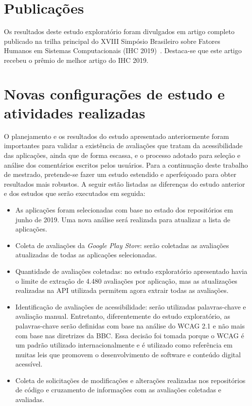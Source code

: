 \section{Publicações}
\label{sec:publicacoes}

Os resultados deste estudo exploratório foram divulgados em artigo completo publicado na trilha principal do XVIII Simpósio Brasileiro sobre Fatores Humanos em Sistemas Computacionais (IHC 2019)~\cite{ihc2019}. Destaca-se que este artigo recebeu o prêmio de melhor artigo do IHC 2019. 

\section{Novas configurações de estudo e atividades realizadas}
\label{sec:atividadesrealizadas}

O planejamento e os resultados do estudo apresentado anteriormente foram importantes para validar a existência de avaliações que tratam da acessibilidade das aplicações, ainda que de forma escassa, e o processo adotado para seleção e análise dos comentários escritos pelos usuários. 
Para a continuação deste trabalho de mestrado, pretende-se fazer um estudo estendido e aperfeiçoado para obter resultados mais robustos. A seguir estão listadas as diferenças do estudo anterior e dos estudos que serão executados em seguida:
\begin{itemize}
 \item As aplicações foram selecionadas com base no estado dos repositórios em junho de 2019. Uma nova análise será realizada para atualizar a lista de aplicações.
 \item Coleta de avaliações da \textit{Google Play Store}: serão coletadas as avaliações atualizadas de todas as aplicações selecionadas.
 \item Quantidade de avaliações coletadas: no estudo exploratório apresentado havia o limite de extração de 4.480 avaliações por aplicação, mas as atualizações realizadas na API utilizada permitem agora extrair todas as avaliações.
 \item Identificação de avaliações de acessibilidade: serão utilizadas palavras-chave e avaliação manual. Entretanto, diferentemente do estudo exploratório, as palavras-chave serão definidas com base na análise do WCAG 2.1 e não mais com base nas diretrizes da BBC. Essa decisão foi tomada porque o WCAG é um padrão utilizado internacionalmente e é utilizado como referência em muitas leis que promovem o desenvolvimento de software e conteúdo digital acessível. 
 \item Coleta de solicitações de modificações e alterações realizadas nos repositórios de código e cruzamento de informações com as avaliações coletadas e avaliadas.
 
\end{itemize}


